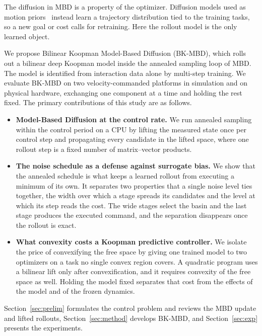 \documentclass[letterpaper,10pt,conference]{ieeeconf}
\newcommand{\bkmbd}{\textsc{BK-MBD}}
\begin{document}
The diffusion in MBD is a property of the optimizer.
Diffusion models used as motion priors~\cite{janner2022planning, chi2025diffusion, carvalho2023motion} instead learn a trajectory distribution tied to the training tasks, so a new goal or cost calls for retraining.
Here the rollout model is the only learned object.

We propose Bilinear Koopman Model-Based Diffusion (\bkmbd{}), which rolls out a bilinear deep Koopman model inside the annealed sampling loop of MBD.
The model is identified from interaction data alone by multi-step training.
We evaluate \bkmbd{} on two velocity-commanded platforms in simulation and on physical hardware, exchanging one component at a time and holding the rest fixed.
The primary contributions of this study are as follows.

\begin{itemize}
\item \textbf{Model-Based Diffusion at the control rate.}
We run annealed sampling within the control period on a CPU by lifting the measured state once per control step and propagating every candidate in the lifted space, where one rollout step is a fixed number of matrix--vector products.

\item \textbf{The noise schedule as a defense against surrogate bias.}
We show that the annealed schedule is what keeps a learned rollout from executing a minimum of its own.
It separates two properties that a single noise level ties together, the width over which a stage spreads its candidates and the level at which its step reads the cost.
The wide stages select the basin and the last stage produces the executed command, and the separation disappears once the rollout is exact.

\item \textbf{What convexity costs a Koopman predictive controller.}
We isolate the price of convexifying the free space by giving one trained model to two optimizers on a task no single convex region covers.
A quadratic program uses a bilinear lift only after convexification, and it requires convexity of the free space as well.
Holding the model fixed separates that cost from the effects of the model and of the frozen dynamics.
\end{itemize}

Section~\ref{sec:prelim} formulates the control problem and reviews the MBD update and lifted rollouts, Section~\ref{sec:method} develops \bkmbd{}, and Section~\ref{sec:exp} presents the experiments.
\end{document}
